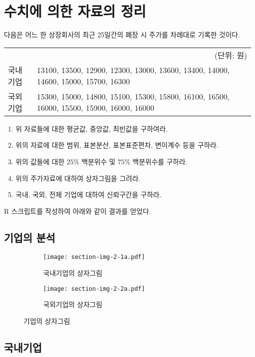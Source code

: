 \section{수치에 의한 자료의 정리}
다음은 어느 한 상장회사의 최근 25일간의 폐장 시 주가를 차례대로 기록한 것이다.

\begin{tabularx}{0.9\textwidth}{ l|X }
  \multicolumn{2}{r}{\small(단위: 원)} \\
  \noalign{\smallskip}\hline\noalign{\smallskip}
  국내기업 &
  13100, 13500, 12900, 12300, 13000, 13600, 13400, 14000, 14600, 15000,
  15700, 16300 \\
  국외기업 &
  15300, 15000, 14800, 15100, 15300, 15800, 16100, 16500, 16000, 15500,
  15900, 16000, 16000
\end{tabularx}

\begin{enumerate}
  \item 위 자료들에 대한 평균값, 중앙값, 최빈값을 구하여라.
  \item 위의 자료에 대한 범위, 표본분산, 표본표준편차, 변이계수 등을 구하라.
  \item 위의 값들에 대한 $25\%$ 백분위수 및 $75\%$ 백분위수를 구하라.
  \item 위의 주가자료에 대하여 상자그림을 그려라.
  \item 국내, 국외, 전체 기업에 대하여 신뢰구간을 구하라.
\end{enumerate}

R 스크립트를 작성하여 아래와 같이 결과를 얻었다.


\subsection{기업의 분석}
\begin{figure}[!hb]
  \begin{subfigure}{0.5\textwidth}
    \centering
    \texttt{[image: section-img-2-1a.pdf]}
    \caption{국내기업의 상자그림}
  \end{subfigure}
  \begin{subfigure}{0.5\textwidth}
    \centering
    \texttt{[image: section-img-2-2a.pdf]}
    \caption{국외기업의 상자그림}
  \end{subfigure}
  \caption{기업의 상자그림}
\end{figure}

\subsection{국내기업}

